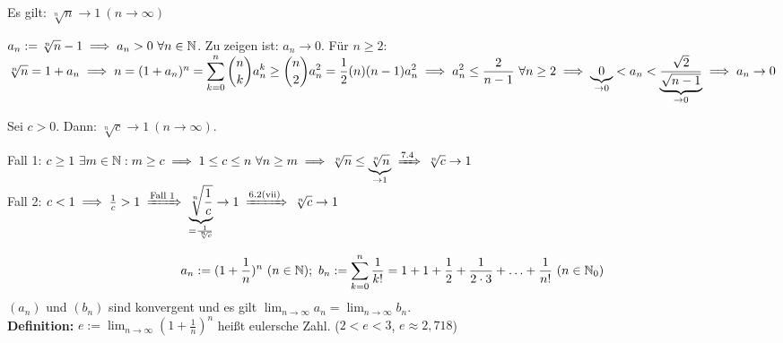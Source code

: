 \documentclass[a4paper,oneside,DIV15,BCOR12mm]{scrbook}
\begin{document}
\begin{satz}
Es gilt: $\sqrt[n]{n} \to 1 \ (n \to \infty)$
\end{satz}

\begin{beweis}
$a_n := \sqrt[n]{n} -1 \folgt a_n > 0 \ \forall n \in\MdN$. Zu zeigen ist: $a_n \to 0$. Für $n \ge 2$: $\sqrt[n]{n} = 1 + a_n \implies n = (1+a_n)^n = \displaystyle\sum_{k=0}^n \binom{n}{k}a_n^k \ge \binom{n}{2}a_n^2 = \frac{1}{2}(n)(n-1)a_n^2 \implies a_n^2 \le \frac{2}{n-1} \ \forall n\ge 2 \implies \underbrace{0}_{\to 0} < a_n < \underbrace{\frac{\sqrt{2}}{\sqrt{n-1}}}_{\to 0} \implies a_n \to 0$
\end{beweis}

\begin{wichtigesbeispiel}
Sei $c>0$. Dann: $\sqrt[n]{c} \to 1 \ (n\to\infty)$.
\end{wichtigesbeispiel}

\begin{beweis} 
Fall 1: $c\ge 1 \ \exists m \in\MdN: m \ge c \folgt 1\le c\le n \ \forall n\ge m \folgt \sqrt[n]{n} \le \underbrace{\sqrt[n]{n}}_{\to 1} \folgtnach{7.4} \sqrt[n]{c} \to 1$ \\
Fall 2: $c<1 \folgt \frac{1}{c} > 1 \folgtnach{Fall 1} \underbrace{\sqrt[n]{\frac{1}{c}}}_{=\frac{1}{\sqrt[n]{c}}} \to 1 \folgtnach{6.2(vii)} \sqrt[n]{c} \to 1$
\end{beweis}

\begin{satz}
$$a_n := (1+\frac{1}{n})^n \ (n\in\MdN);\ b_n := \displaystyle\sum_{k=0}^n \frac{1}{k!} = 1 + 1 + \frac{1}{2} + \frac{1}{2\cdot3}+ \ldots + \frac{1}{n!}\ (n\in\MdN_0)$$
$(a_n)$ und $(b_n)$ sind konvergent und es gilt $\displaystyle\lim_{n\to\infty} a_n = \displaystyle\lim_{n\to\infty} b_n$.\\
\textbf{Definition:} $e := \displaystyle\lim_{n\to\infty} (1+\frac{1}{n})^n$ heißt eulersche Zahl. ($2<e<3$, $e\approx 2,718$)
\end{satz}
\end{document}
